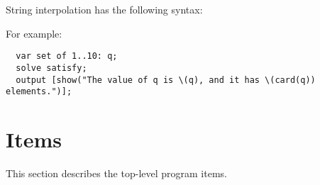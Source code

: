 \documentclass[10pt]{scrartcl}
\begin{document}
String interpolation has the following syntax:
\begin{productions}
  \RuleStringLiteral
\end{productions}

For example:
\begin{verbatim}
  var set of 1..10: q;
  solve satisfy;
  output [show("The value of q is \(q), and it has \(card(q)) elements.")];
\end{verbatim}

\section{Items}
  \label{Items}
This section describes the top-level program items.
\end{document}
